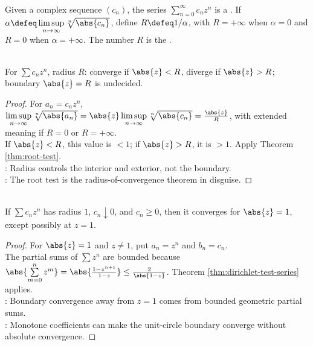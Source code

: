 \begin{definition} \label{def:power-series-radius-basic} \\
Given a complex sequence $(c_n)$, the series $\sum\limits_{n=0}^{\infty}c_nz^n$ is a . If $\alpha\defeq\limsup\limits_{n\to\infty}\sqrt[n]{\abs{c_n}}$, define $R\defeq1/\alpha$, with $R=+\infty$ when $\alpha=0$ and $R=0$ when $\alpha=+\infty$. The number $R$ is the .
\end{definition}

\begin{theorem} \label{thm:power-series-radius-convergence} \\
For $\sum c_nz^n$, radius $R$: converge if $\abs{z}<R$, diverge if $\abs{z}>R$; boundary $\abs{z}=R$ is undecided.
\begin{proof}
For $a_n=c_nz^n$, $\limsup\limits_{n\to\infty}\sqrt[n]{\abs{a_n}}=\abs{z}\limsup\limits_{n\to\infty}\sqrt[n]{\abs{c_n}}=\frac{\abs{z}}{R}$, with extended meaning if $R=0$ or $R=+\infty$.\\
If $\abs{z}<R$, this value is $<1$; if $\abs{z}>R$, it is $>1$. Apply Theorem \ref{thm:root-test}.\\
: Radius controls the interior and exterior, not the boundary.\\
: The root test is the radius-of-convergence theorem in disguise.
\end{proof}
\end{theorem}

\begin{theorem} \label{thm:power-series-boundary-dirichlet} \\
If $\sum c_nz^n$ has radius $1$, $c_n\downarrow0$, and $c_n\geq0$, then it converges for $\abs{z}=1$, except possibly at $z=1$.
\begin{proof}
For $\abs{z}=1$ and $z\neq1$, put $a_n=z^n$ and $b_n=c_n$.\\
The partial sums of $\sum z^n$ are bounded because $\abs{\sum\limits_{m=0}^{n}z^m}=\abs{\frac{1-z^{n+1}}{1-z}}\leq\frac{2}{\abs{1-z}}$. Theorem \ref{thm:dirichlet-test-series} applies.\\
: Boundary convergence away from $z=1$ comes from bounded geometric partial sums.\\
: Monotone coefficients can make the unit-circle boundary converge without absolute convergence.
\end{proof}
\end{theorem}

